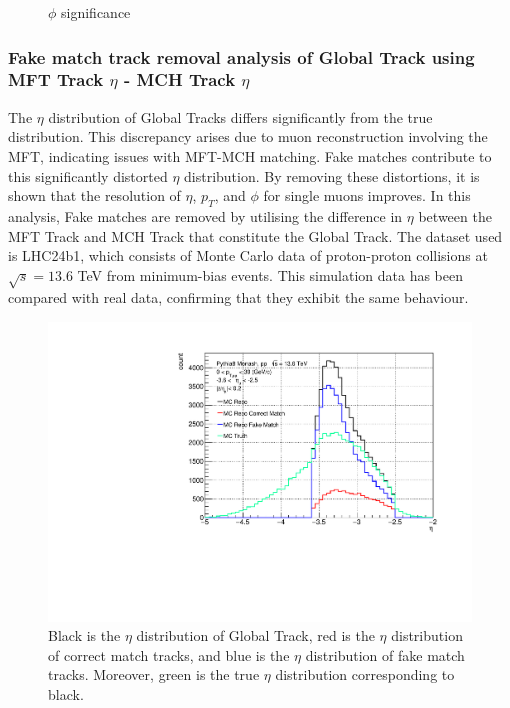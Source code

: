 \begin{figure}[htbp]
\begin{minipage}{0.45\textwidth}
                    \caption{$\phi$ significance}
                    \label{fig:phi_significance}
                \end{minipage}
            \end{figure}

        \subsubsection{Fake match track removal analysis of Global Track using MFT Track $\eta$ - MCH Track $\eta$}
        \label{Analysis:Matching}
            The \(\eta\) distribution of Global Tracks differs significantly from the true distribution. This discrepancy arises due to muon reconstruction involving the MFT, indicating issues with MFT-MCH matching. Fake matches contribute to this significantly distorted \(\eta\) distribution. By removing these distortions, it is shown that the resolution of \(\eta\), \(p_T\), and \(\phi\) for single muons improves. In this analysis, Fake matches are removed by utilising the difference in \(\eta\) between the MFT Track and MCH Track that constitute the Global Track. The dataset used is LHC24b1, which consists of Monte Carlo data of proton-proton collisions at \(\sqrt{s} = 13.6\) TeV from minimum-bias events. This simulation data has been compared with real data, confirming that they exhibit the same behaviour. %
            \begin{figure}[H]
                \centering
                \includegraphics[keepaspectratio, scale=0.5]{fig/3_5_6_etacutno_eta.pdf}
                \caption{Black is the $\eta$ distribution of Global Track, red is the $\eta$ distribution of correct match tracks, and blue is the $\eta$ distribution of fake match tracks. Moreover, green is the true $\eta$ distribution corresponding to black.}
                \label{Analysis:Matching:eta}
            \end{figure}
